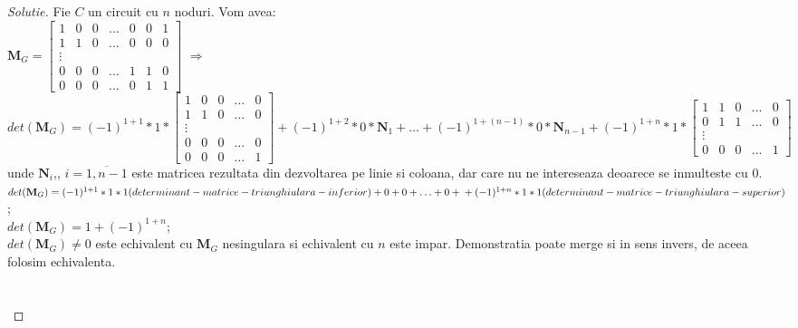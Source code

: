 \documentclass[12pt]{article}
\newenvironment{problema}[2][Problema]{\begin{trivlist}
\item[\hskip \labelsep {\bfseries #1}\hskip \labelsep {\bfseries #2.}]}{\end{trivlist}}
\begin{document}
\begin{proof}[Solutie]
Fie \(C\) un circuit cu \(n\) noduri. Vom avea:\\
\(\mathbf{M}_{G} = \begin{bmatrix}
    1       & 0 & 0 & \dots & 0&0&1 \\
    1       & 1 & 0 & \dots & 0&0&0 \\
    \vdots \\
    0       & 0 & 0 & \dots & 1&1&0 \\
    0       & 0 & 0 & \dots & 0&1&1 
\end{bmatrix}\) \(\Rightarrow\) \(det(\mathbf{M}_{G}) = (-1)^{1+1}*1*\begin{bmatrix}
    1       & 0 & 0 & \dots &0 \\
    1       & 1 & 0 & \dots &0 \\
    \vdots \\
    0       & 0 & 0 & \dots &0 \\
    0       & 0 & 0 & \dots &1 
\end{bmatrix} + (-1)^{1+2}*0*\mathbf{N}_{1}+\ldots+(-1)^{1+(n-1)}*0*\mathbf{N}_{n-1}+(-1)^{1+n}*1*\begin{bmatrix}
    1       & 1 & 0 & \dots &0 \\
    0       & 1 & 1 & \dots &0 \\
    \vdots \\
    0       & 0 & 0 & \dots &1 
\end{bmatrix}\) \\
unde \(\mathbf{N}_{i}\),, \(i=\overline{1, n-1}\) este matricea rezultata din dezvoltarea pe linie si coloana, dar care nu ne intereseaza deoarece se inmulteste cu 0.\\ \(det(\mathbf{M}_{G})=(-1)^{1+1}*1*1(determinant-matrice-triunghiulara-inferior)+0+0+\ldots+0+\\+(-1)^{1+n}*1*1(determinant-matrice-triunghiulara-superior)\);\\
\(det(\mathbf{M}_{G})=1+(-1)^{1+n}\);\\
\(det(\mathbf{M}_{G})\neq{0}\) este echivalent cu \(\mathbf{M}_{G}\) nesingulara si echivalent cu \(n\) este impar. Demonstratia poate merge si in sens invers, de aceea folosim echivalenta.\\\\\\
\end{proof}



\begin{problema}{4}
\end{problema}
 
\end{document}
